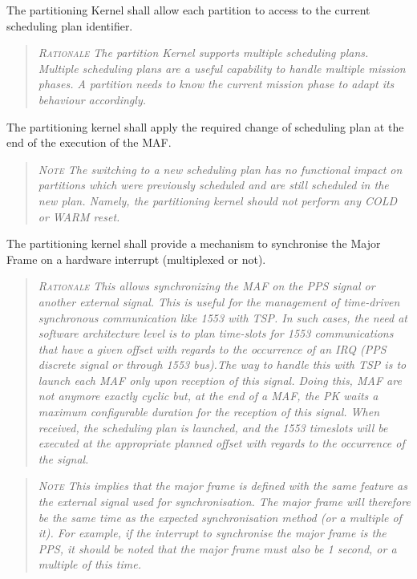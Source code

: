The partitioning Kernel shall allow each partition to access to the current scheduling plan identifier.
\begin{quote}\it
\textsc{Rationale}
The partition Kernel supports multiple scheduling plans. Multiple scheduling plans are a useful capability to handle multiple mission phases. A partition needs to know the current mission phase to adapt its behaviour accordingly.
\end{quote}

The partitioning kernel shall apply the required change of scheduling plan at the end of the execution of the MAF.
\begin{quote}\it
\textsc{Note}
The switching to a new scheduling plan has no functional impact on partitions which were previously scheduled and are still scheduled in the new plan. Namely, the partitioning kernel should not perform any COLD or WARM reset.
\end{quote}

The partitioning kernel shall provide a mechanism to synchronise the Major Frame on a hardware interrupt (multiplexed or not).
\begin{quote}\it
\textsc{Rationale}
This allows synchronizing the MAF on the PPS signal or another external signal. This is useful for the management of time-driven synchronous communication like 1553 with TSP. In such cases, the need at software architecture level is to plan time-slots for 1553 communications that have a given offset with regards to the occurrence of an IRQ (PPS discrete signal or through 1553 bus).The way to handle this with TSP is to launch each MAF only upon reception of this signal. Doing this, MAF are not anymore exactly cyclic but, at the end of a MAF, the PK waits a maximum configurable duration for the reception of this signal. When received, the scheduling plan is launched, and the 1553 timeslots will be executed at the appropriate planned offset with regards to the occurrence of the signal.
\end{quote}
\begin{quote}\it
\textsc{Note}
This implies that the major frame is defined with the same feature as the external signal used for synchronisation.  The major frame will therefore be the same time as the expected synchronisation method (or a multiple of it). For example, if the interrupt to synchronise the major frame is the PPS, it should be noted that the major frame must also be 1 second, or a multiple of this time.
\end{quote}

